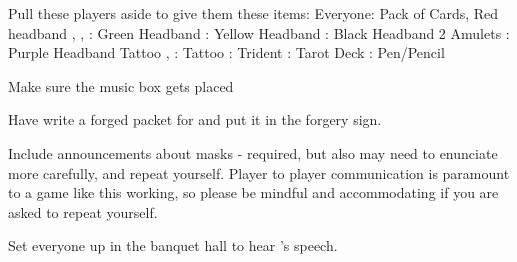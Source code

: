 \documentclass[green]{NeptuneBall}
\begin{document}
\name{\gChecklist{}}

Pull these players aside to give them these items:
Everyone: Pack of Cards, Red headband
\cAriel{}, \cWillow{}, \cGeneral{}: Green Headband
\cPrince{}: Yellow Headband
\cWitch{}: Black Headband
			2	Amulets
\cQueen{}: Purple Headband
			Tattoo
\cDiplomat{}, \cSpy{}: Tattoo
\cKing{}: Trident
\cSlave{}: Tarot Deck
\cGeneral{}: Pen/Pencil
	
Make sure the music box gets placed	

Have \cPlant{} write a forged packet for \cPriest{} and put it in the forgery sign.

Include announcements about masks - required, but also may need to enunciate more carefully, and repeat yourself. Player to player communication is paramount to a game like this working, so please be mindful and accommodating if you are asked to repeat yourself.

Set everyone up in the banquet hall to hear \cManta{}'s speech.
\end{document}
